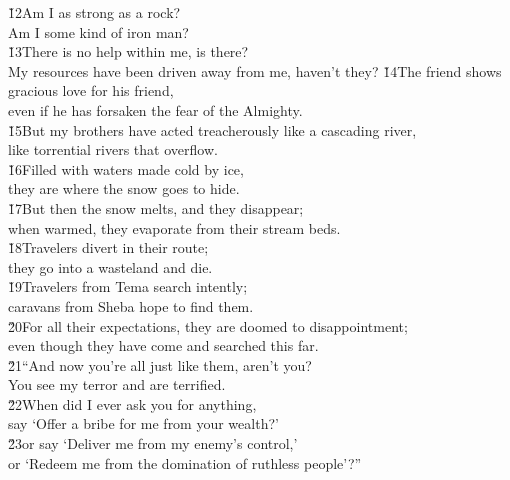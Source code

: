 \begin{poetry}
\poeml \v{12}Am I as strong as a rock? \\
\poemll    Am I some kind of iron man? \\
\poeml \v{13}There is no help within me, is there? \\
\poemll    My resources have been driven away from me, haven't they?
\poeml \v{14}The friend shows gracious love for his friend, \\
\poemll    even if he has forsaken the fear of the Almighty. \\
\poeml \v{15}But my brothers have acted treacherously like a cascading river, \\
\poemll    like torrential rivers that overflow. \\
\poeml \v{16}Filled with waters made cold by ice, \\
\poemll    they are where the snow goes to hide. \\
\poeml \v{17}But then the snow melts, and they disappear; \\
\poemll    when warmed, they evaporate from their stream beds. \\
\poeml \v{18}Travelers divert in their route; \\
\poemll    they go into a wasteland and die. \\
\poeml \v{19}Travelers from Tema search intently; \\
\poemll    caravans from Sheba hope to find them. \\
\poeml \v{20}For all their expectations, they are doomed to disappointment; \\
\poemll    even though they have come and searched this far. \\
\poeml \v{21}``And now you're all just like them, aren't you? \\
\poemll    You see my terror and are terrified. \\
\poeml \v{22}When did I ever ask you for anything, \\
\poemll    say `Offer a bribe for me from your wealth?' \\
\poeml \v{23}or say `Deliver me from my enemy's control,' \\
\poemll    or `Redeem me from the domination of ruthless people'?''

\end{poetry}
